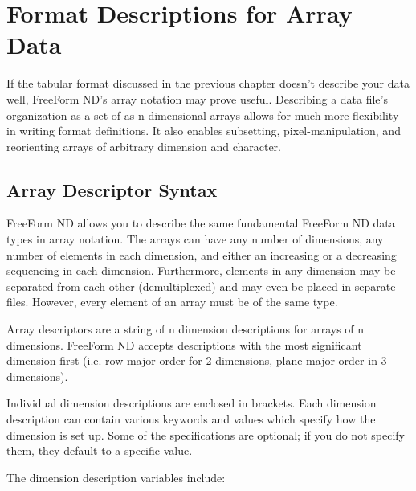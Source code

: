 %
%

\chapter{Format Descriptions for Array Data}
\label{ff,arrayfmt}

If the tabular format discussed in the previous chapter doesn't
describe your data well, FreeForm ND's array notation may prove
useful. Describing a data file's organization as a set of as
n-dimensional arrays allows for much more flexibility in writing
format definitions. It also enables subsetting, pixel-manipulation,
and reorienting arrays of arbitrary dimension and character.

\section{Array Descriptor Syntax}
\label{ff,arraydesc}

FreeForm ND allows you to describe the same fundamental FreeForm ND
data types in array notation. The arrays can have any number of
dimensions, any number of elements in each dimension, and either an
increasing or a decreasing sequencing in each dimension. Furthermore,
elements in any dimension may be separated from each other
(demultiplexed) and may even be placed in separate files. However,
every element of an array must be of the same type.

Array descriptors are a string of n dimension descriptions for arrays
of n dimensions.  FreeForm ND accepts descriptions with the most
significant dimension first (i.e. row-major order for 2 dimensions,
plane-major order in 3 dimensions).

Individual dimension descriptions are enclosed in brackets. Each
dimension description can contain various keywords and values which
specify how the dimension is set up. Some of the specifications are
optional; if you do not specify them, they default to a specific
value.


The dimension description variables include: 

